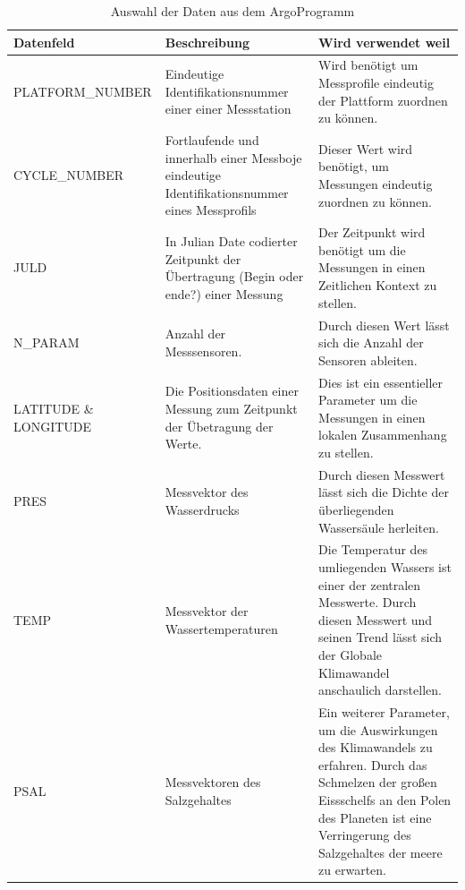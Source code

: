 \begin{center}
\begin{table}
  \label{table:Datenauswahl}
  \begin{tabular}{ | l | p{4cm} |p{6cm} |}
    \hline
    \textbf{Datenfeld} & \textbf{Beschreibung} & \textbf{Wird verwendet weil} \\\hline
   
    PLATFORM\_NUMBER 
        & Eindeutige Identifikationsnummer einer einer Messstation
        & Wird benötigt um Messprofile eindeutig der Plattform zuordnen zu können. \\\hline 
    
    CYCLE\_NUMBER 
        & Fortlaufende und innerhalb einer Messboje eindeutige Identifikationsnummer eines Messprofils
        & Dieser Wert wird benötigt, um Messungen eindeutig zuordnen zu können. \\\hline
    
    JULD
        & In Julian Date codierter Zeitpunkt der Übertragung (Begin oder ende?) einer Messung
        & Der Zeitpunkt wird benötigt um die Messungen in einen Zeitlichen Kontext zu stellen. \\\hline
        
    N\_PARAM
        & Anzahl der Messsensoren. 
        & Durch diesen Wert lässt sich die Anzahl der Sensoren ableiten. \\\hline
        
    LATITUDE \& LONGITUDE
        & Die Positionsdaten einer Messung zum Zeitpunkt der Übetragung der Werte.
        & Dies ist ein essentieller Parameter um die Messungen in einen lokalen Zusammenhang zu stellen. \\\hline
        
    PRES
        & Messvektor des Wasserdrucks
        & Durch diesen Messwert lässt sich die Dichte der überliegenden Wassersäule herleiten. \\\hline
        
    TEMP
        & Messvektor der Wassertemperaturen 
        &  Die Temperatur des umliegenden Wassers ist einer der zentralen Messwerte. Durch diesen Messwert und seinen Trend lässt sich der Globale Klimawandel anschaulich darstellen.  \\\hline
        
    PSAL
        & Messvektoren des Salzgehaltes
        & Ein weiterer Parameter, um die Auswirkungen des Klimawandels zu erfahren. Durch das Schmelzen der großen Eissschelfs an den Polen des Planeten ist eine Verringerung des Salzgehaltes der meere zu erwarten. \\\hline
    \end{tabular}
      \caption{Auswahl der Daten aus dem ArgoProgramm}
\end{table}
\end{center}

